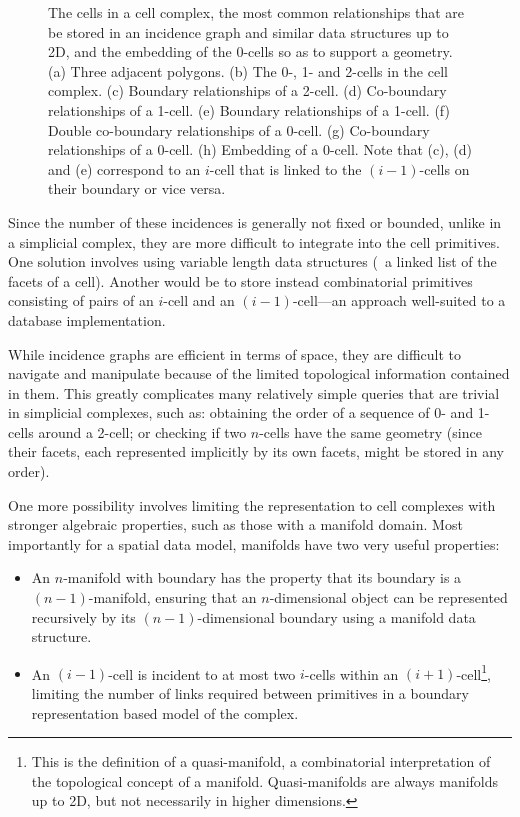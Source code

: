 \begin{figure}[tbp]
{\label{subfig:0-cell-embedding}}
\caption[Relationships in an incidence graph]{The cells in a cell complex, the most common relationships that are be stored in an incidence graph and similar data structures up to 2D, and the embedding of the 0-cells so as to support a geometry.
(a) Three adjacent polygons.
(b) The 0-, 1- and 2-cells in the cell complex.
(c) Boundary relationships of a 2-cell.
(d) Co-boundary relationships of a 1-cell.
(e) Boundary relationships of a 1-cell.
(f) Double co-boundary relationships of a 0-cell.
(g) Co-boundary relationships of a 0-cell.
(h) Embedding of a 0-cell.
Note that (c), (d) and (e) correspond to an $i$-cell that is linked to the $(i-1)$-cells on their boundary or vice versa.}
\label{fig:ds_incidence_graph}
\end{figure}
Since the number of these incidences is generally not fixed or bounded, unlike in a simplicial complex, they are more difficult to integrate into the cell primitives.
One solution involves using variable length data structures (\eg\ a linked list of the facets of a cell).
Another would be to store instead combinatorial primitives consisting of pairs of an $i$-cell and an $(i-1)$-cell---an approach well-suited to a database implementation.

While incidence graphs are efficient in terms of space, they are difficult to navigate and manipulate because of the limited topological information contained in them.
This greatly complicates many relatively simple queries that are trivial in simplicial complexes, such as: obtaining the order of a sequence of 0- and 1-cells around a 2-cell; or checking if two $n$-cells have the same geometry (since their facets, each represented implicitly by its own facets, might be stored in any order).

One more possibility involves limiting the representation to cell complexes with stronger algebraic properties, such as those with a manifold domain.
Most importantly for a spatial data model, manifolds have two very useful properties:
\begin{itemize}
\item
An $n$-manifold with boundary has the property that its boundary is a $(n-1)$-manifold, ensuring that an $n$-dimensional object can be represented recursively by its $(n-1)$-dimensional boundary using a manifold data structure.
\item
An $(i-1)$-cell is incident to at most two $i$-cells within an $(i+1)$-cell\footnote{This is the definition of a quasi-manifold, a combinatorial interpretation of the topological concept of a manifold. Quasi-manifolds are always manifolds up to 2D, but not necessarily in higher dimensions.}, limiting the number of links required between primitives in a boundary representation based model of the complex.
\end{itemize}

